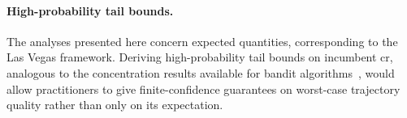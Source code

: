 \paragraph{High-probability tail bounds.}
The analyses presented here concern expected quantities, corresponding
to the Las Vegas framework. Deriving high-probability tail bounds on
incumbent \acrshort{cr}, analogous to the concentration results
available for bandit algorithms~\cite{lattimore2020bandit}, would
allow practitioners to give finite-confidence guarantees on worst-case
trajectory quality rather than only on its expectation.
